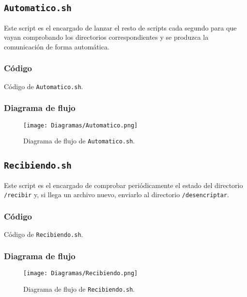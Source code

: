 \documentclass[12pt,letterpaper]{article}
\begin{document}
\subsection{\texttt{Automatico.sh}}
Este script es el encargado de lanzar el resto de scripts cada segundo para que vayan comprobando los directorios correspondientes y se produzca la comunicación de forma automática.

\subsubsection{Código}

\begin{center}
	Código de \texttt{Automatico.sh}.
\end{center}

\newpage
\subsubsection{Diagrama de flujo}
\begin{figure}[h]
	\centering
	\texttt{[image: Diagramas/Automatico.png]}
	\caption{Diagrama de flujo de \texttt{Automatico.sh}.}
	\label{Diagrama de flujo de Automatico.sh}
\end{figure}

\subsection{\texttt{Recibiendo.sh}}
Este script es el encargado de comprobar periódicamente el estado del directorio \texttt{/recibir} y, si llega un archivo nuevo, enviarlo al directorio \texttt{/desencriptar}.

\subsubsection{Código}

\begin{center}
	Código de \texttt{Recibiendo.sh}.
\end{center}

\newpage
\subsubsection{Diagrama de flujo}
\begin{figure}[h]
	\centering
	\texttt{[image: Diagramas/Recibiendo.png]}
	\caption{Diagrama de flujo de \texttt{Recibiendo.sh}.}
	\label{Diagrama de flujo de Recibiendo.sh}
\end{figure}
\end{document}
